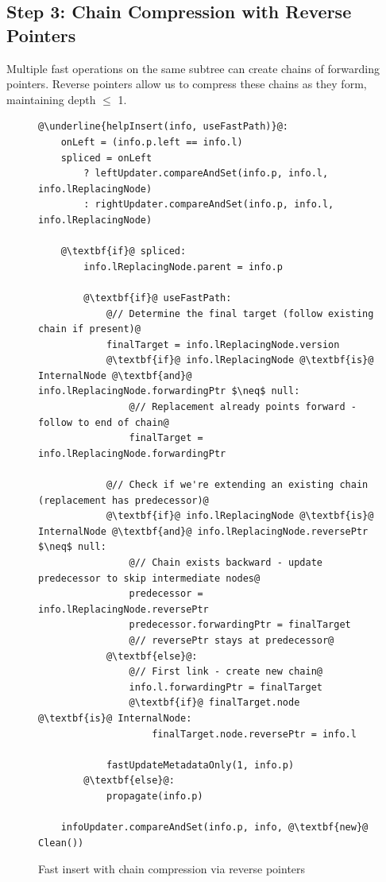\documentclass[acmsmall,screen,nonacm]{acmart}
\begin{document}
\subsection{Step 3: Chain Compression with Reverse Pointers}
\label{sec:chain-compression}

Multiple fast operations on the same subtree can create chains of forwarding pointers. Reverse pointers allow us to compress these chains as they form, maintaining depth $\leq$ 1.


\begin{figure}[H]
\begin{lstlisting}
@\underline{helpInsert(info, useFastPath)}@:
    onLeft = (info.p.left == info.l)
    spliced = onLeft
        ? leftUpdater.compareAndSet(info.p, info.l, info.lReplacingNode)
        : rightUpdater.compareAndSet(info.p, info.l, info.lReplacingNode)
    
    @\textbf{if}@ spliced:
        info.lReplacingNode.parent = info.p
        
        @\textbf{if}@ useFastPath:
            @// Determine the final target (follow existing chain if present)@
            finalTarget = info.lReplacingNode.version
            @\textbf{if}@ info.lReplacingNode @\textbf{is}@ InternalNode @\textbf{and}@ info.lReplacingNode.forwardingPtr $\neq$ null:
                @// Replacement already points forward - follow to end of chain@
                finalTarget = info.lReplacingNode.forwardingPtr
            
            @// Check if we're extending an existing chain (replacement has predecessor)@
            @\textbf{if}@ info.lReplacingNode @\textbf{is}@ InternalNode @\textbf{and}@ info.lReplacingNode.reversePtr $\neq$ null:
                @// Chain exists backward - update predecessor to skip intermediate nodes@
                predecessor = info.lReplacingNode.reversePtr
                predecessor.forwardingPtr = finalTarget
                @// reversePtr stays at predecessor@
            @\textbf{else}@:
                @// First link - create new chain@
                info.l.forwardingPtr = finalTarget
                @\textbf{if}@ finalTarget.node @\textbf{is}@ InternalNode:
                    finalTarget.node.reversePtr = info.l
            
            fastUpdateMetadataOnly(1, info.p)
        @\textbf{else}@:
            propagate(info.p)
    
    infoUpdater.compareAndSet(info.p, info, @\textbf{new}@ Clean())
\end{lstlisting}
\caption{Fast insert with chain compression via reverse pointers}
\label{fig:fast-insert-final}
\end{figure}
\end{document}
